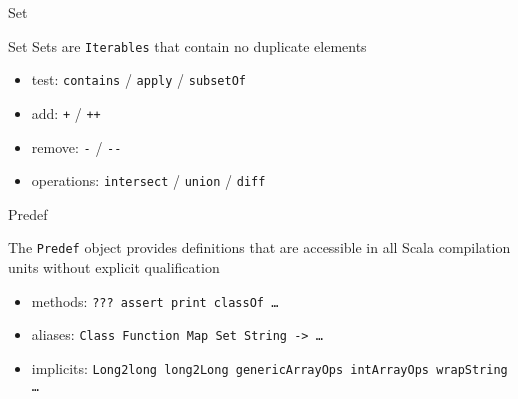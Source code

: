 \documentclass[aspectratio=169]{beamer}
\begin{document}
\begin{frame}[fragile]{Set}
\begin{center}
\end{center}
\end{frame}

\begin{frame}{Set}
Sets are \texttt{Iterables} that contain no duplicate elements
\vspace{1em}
\begin{itemize}
  \item test: \texttt{contains} / \texttt{apply} / \texttt{subsetOf}
  \item add: \texttt{+} / \texttt{++}
  \item remove: \texttt{-} / \texttt{-{}-}
  \item operations: \texttt{intersect} / \texttt{union} / \texttt{diff}
\end{itemize}
\end{frame}

\begin{frame}{Predef}
 \begin{block}{}
   The \texttt{Predef} object provides definitions that are accessible in all Scala compilation units without
   explicit qualification
 \end{block}
 \vspace{1em}
 \pause
 \begin{itemize}
   \item methods: \texttt{??? assert print classOf \ldots}
   \item aliases: \texttt{Class Function Map Set String -> \ldots}
   \item implicits: \texttt{Long2long long2Long genericArrayOps intArrayOps wrapString \ldots} 
 \end{itemize}
\end{frame}
\end{document}
